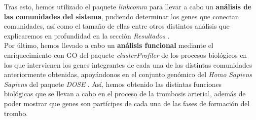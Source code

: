 Tras esto, hemos utilizado el paquete \textit{linkcomm} \cite{linkcomm} para llevar a cabo un \textbf{análisis de las comunidades del sistema}, pudiendo determinar los genes que conectan comunidades, así como el tamaño de ellas entre otros distintos análisis que explicaremos en profundidad en la sección \textit{Resultados} .\\

Por último, hemos llevado a cabo un \textbf{análisis funcional} mediante el enriquecimiento con GO del paquete \textit{clusterProfiler} \cite{clusterProfiler} de los procesos biológicos en los que intervienen los genes integrantes de cada una de las distintas comunidades anteriormente obtenidas, apoyándonos en el conjunto genómico del \textit{Homo Sapiens Sapiens} del paquete \textit{DOSE} \cite{DOSE}.  Así, hemos obtenido las distintas funciones biológicas que se llevan a cabo en el proceso de la trombosis arterial, además de poder mostrar que genes son partícipes de cada una de las fases de formación del trombo.

